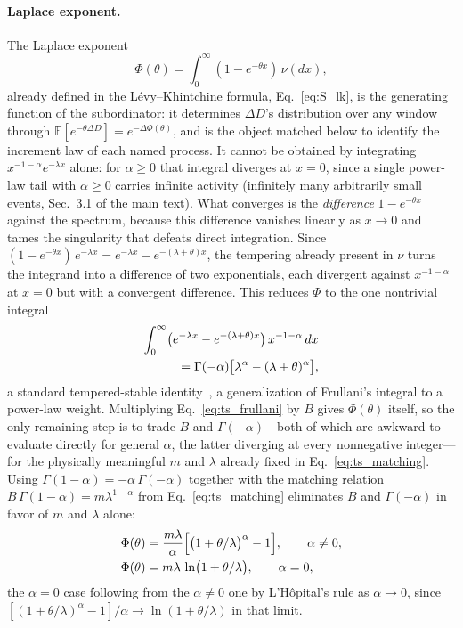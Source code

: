 \documentclass[preprint,12pt]{elsarticle}
\begin{document}
\paragraph*{Laplace exponent.}
The Laplace exponent
\begin{equation}
  \Phi(\theta)=\int_0^\infty(1-e^{-\theta x})\,\nu(dx),
\end{equation}
already defined in the L\'evy--Khintchine formula, Eq.~\eqref{eq:S_lk}, is the generating function of the subordinator: it determines $\Delta D$'s distribution over any window through $\mathbb{E}[e^{-\theta\Delta D}]=e^{-\Delta\Phi(\theta)}$, and is the object matched below to identify the increment law of each named process. It cannot be obtained by integrating
$x^{-1-\alpha}e^{-\lambda x}$ alone: for $\alpha\ge0$ that integral diverges
at $x=0$, since a single power-law tail with $\alpha\ge0$ carries infinite
activity (infinitely many arbitrarily small events, Sec.~3.1 of the main
text). What converges is the \emph{difference} $1-e^{-\theta x}$ against
the spectrum, because this difference vanishes linearly as $x\to0$ and tames
the singularity that defeats direct integration. Since
$(1-e^{-\theta x})\,e^{-\lambda x}=e^{-\lambda x}-e^{-(\lambda+\theta)x}$, the
tempering already present in $\nu$ turns the integrand into a difference of
two exponentials, each divergent against $x^{-1-\alpha}$ at $x=0$ but with a
convergent difference. This reduces $\Phi$ to the one nontrivial integral
\begin{align}
  \int_0^\infty\bigl(e^{-\lambda x}-e^{-(\lambda+\theta)x}\bigr)\,x^{-1-\alpha}\,dx
  \notag\\
  =\Gamma(-\alpha)\bigl[\lambda^\alpha-(\lambda+\theta)^\alpha\bigr],
  \label{eq:ts_frullani}
\end{align}
a standard tempered-stable identity~\cite{Rosinski2007}, a generalization of
Frullani's integral to a power-law weight. Multiplying
Eq.~\eqref{eq:ts_frullani} by $B$ gives $\Phi(\theta)$ itself, so the only remaining step is to trade $B$ and
$\Gamma(-\alpha)$---both of which are awkward to evaluate directly for
general $\alpha$, the latter diverging at every nonnegative integer---for
the physically meaningful $m$ and $\lambda$ already fixed in
Eq.~\eqref{eq:ts_matching}. Using $\Gamma(1-\alpha)=-\alpha\,\Gamma(-\alpha)$
together with the matching relation $B\,\Gamma(1-\alpha)=m\lambda^{1-\alpha}$
from Eq.~\eqref{eq:ts_matching} eliminates $B$ and $\Gamma(-\alpha)$ in
favor of $m$ and $\lambda$ alone:
\begin{align}
  \Phi(\theta)&=\frac{m\lambda}{\alpha}
    \Bigl[\bigl(1+\theta/\lambda\bigr)^{\alpha}-1\Bigr],
    \qquad\alpha\neq0,
  \label{eq:ts_laplace_exponent}\\
  \Phi(\theta)&=m\lambda\,\ln\bigl(1+\theta/\lambda\bigr),
    \qquad\alpha=0,
  \label{eq:ts_laplace_exponent_gamma}
\end{align}
the $\alpha=0$ case following from the $\alpha\neq0$ one by L'H\^opital's
rule as $\alpha\to0$, since $[(1+\theta/\lambda)^\alpha-1]/\alpha\to\ln(1+\theta/\lambda)$
in that limit.
\end{document}
